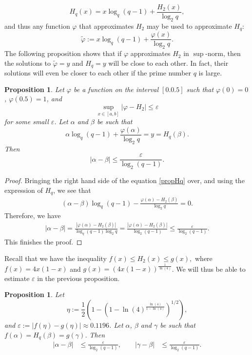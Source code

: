 \documentclass{article}
\newtheorem{proposition}[theorem]{Proposition}%
\begin{document}
\[H_{q}(x) = x\log_{q}(q-1)+\frac{H_{2}(x)}{\log_{2}q},\]
and thus any function $\varphi$ that approximates $H_{2}$ may be used to approximate $H_{q}$:
\[
\widetilde{\varphi}:=x\log_{q}(q-1)+\frac{\varphi(x)}{\log_{2}q}.
\]
The following proposition shows that if $\varphi$ approximates $H_{2}$ in $\sup$-norm, then the solutions to $\widetilde{\varphi}=y$ and $H_{q}=y$ will be close to each other. In fact, their solutions will even be closer to each other if the prime number $q$ is large. 
\medskip
\begin{proposition}\label{prop401}
	Let $\varphi$ be a function on the interval $[0.0.5]$ such that $\varphi(0)=0$, $\varphi(0.5)=1$, and 
	\[
	\sup_{x\in [a,b]}|\varphi-H_{2}|\leq \varepsilon
	\]
	for some small $\varepsilon$. Let $\alpha$ and $\beta$ be such that 
	\begin{equation}\label{propHq}
		\alpha\log_{q}(q-1)+\frac{\varphi(\alpha)}{\log_{2}q}=y=H_{q}(\beta).
	\end{equation}
	Then 
	\begin{equation}\label{propbound}
	|\alpha-\beta|\leq \frac{\varepsilon}{\log_{2}(q-1)}.
	\end{equation}
\end{proposition}
\begin{proof}
	Bringing the right hand side of the equation \eqref{propHq} over, and using the expression of $H_{q}$, we see that 
	\begin{align}
		\left(\alpha-\beta\right)\log_{q}(q-1)-\frac{\varphi(\alpha)-H_{2}(\beta)}{\log_{2}q}=0.
	\end{align}
	Therefore, we have 
	\begin{align}
		|\alpha-\beta| = \frac{|\varphi(\alpha)-H_{2}(\beta)|}{\log_{q}(q-1)\log_{2}q} =
		\frac{|\varphi(\alpha)-H_{2}(\beta)|}{\log_{2}(q-1)} \leq 
		\frac{\varepsilon}{\log_{2}(q-1)}.
	\end{align}
	This finishes the proof. 
\end{proof}

Recall that we have the inequality
$
f(x) \leq H_{2}(x) \leq g(x),
$
where $f(x) = 4x(1-x)$ and $g(x) = (4x(1-x))^{\frac{1}{\ln(4)}}$. We will thus be able to estimate $\varepsilon$ in the previous proposition. 

\begin{proposition}\label{prope}
	Let 
	\[\eta := \frac{1}{2}\left(1-\left(1-\ln(4)^{\frac{\ln(4)}{1-\ln(4)}}\right)^{1/2}\right),\] 
	and $\varepsilon := |f(\eta)-g(\eta)|\approx 0.1196$. 
	Let $\alpha$, $\beta$ and $\gamma$ be such that $f(\alpha)=H_{q}(\beta)=g(\gamma)$. Then 
	\begin{equation}
		\begin{aligned}
			|\alpha-\beta| &\leq \frac{\varepsilon}{\log_{2}(q-1)},\qquad
			|\gamma - \beta| & \leq \frac{\varepsilon}{\log_{2}(q-1)}.
		\end{aligned}
	\end{equation}
\end{proposition}
\end{document}
